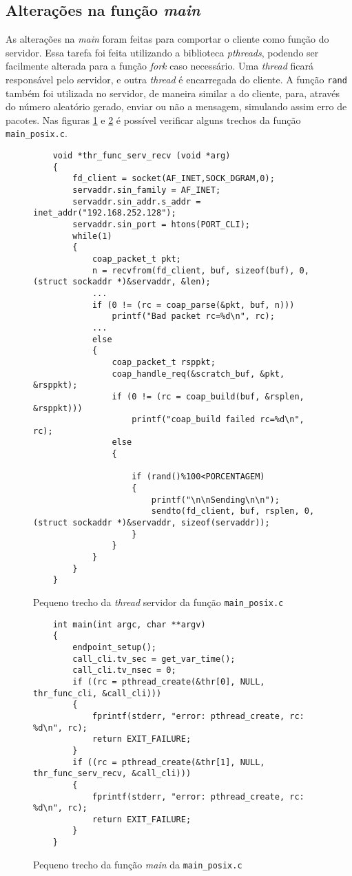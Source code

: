 \subsection{Alterações na função \textit{main}}

As alterações na \textit{main} foram feitas para comportar o cliente como função do servidor. Essa tarefa foi feita utilizando a biblioteca \textit{pthreads}, podendo ser facilmente alterada para a função \textit{fork} caso necessário. Uma \textit{thread} ficará responsável pelo servidor, e outra \textit{thread} é encarregada do cliente. A função \texttt{rand} também foi utilizada no servidor, de maneira similar a do cliente, para, através do número aleatório gerado, enviar ou não a mensagem, simulando assim erro de pacotes. Nas figuras \ref{code:thread_serv_main_posix.c} e \ref{code:main_main_posic.c} é possível verificar alguns trechos da função \texttt{main\_posix.c}.

\begin{figure}[!htb]
	\begin{lstlisting}
	void *thr_func_serv_recv (void *arg)
	{
		fd_client = socket(AF_INET,SOCK_DGRAM,0);
		servaddr.sin_family = AF_INET;
		servaddr.sin_addr.s_addr = inet_addr("192.168.252.128");
		servaddr.sin_port = htons(PORT_CLI);
		while(1)
		{
			coap_packet_t pkt;
			n = recvfrom(fd_client, buf, sizeof(buf), 0, (struct sockaddr *)&servaddr, &len);
			...
			if (0 != (rc = coap_parse(&pkt, buf, n)))
				printf("Bad packet rc=%d\n", rc);
			...
			else
			{			
				coap_packet_t rsppkt;
				coap_handle_req(&scratch_buf, &pkt, &rsppkt);
				if (0 != (rc = coap_build(buf, &rsplen, &rsppkt)))
					printf("coap_build failed rc=%d\n", rc);
				else
				{
					
					if (rand()%100<PORCENTAGEM)
					{
						printf("\n\nSending\n\n");
						sendto(fd_client, buf, rsplen, 0, (struct sockaddr *)&servaddr, sizeof(servaddr));
					}
				}
			}
		}
	}
	\end{lstlisting}
	\caption{Pequeno trecho da \textit{thread} servidor da função \texttt{main\_posix.c}}
	\label{code:thread_serv_main_posix.c}
\end{figure}


\begin{figure}[!htb]
	\begin{lstlisting}
	int main(int argc, char **argv)
	{
		endpoint_setup();
		call_cli.tv_sec = get_var_time();
		call_cli.tv_nsec = 0;
		if ((rc = pthread_create(&thr[0], NULL, thr_func_cli, &call_cli)))
		{
			fprintf(stderr, "error: pthread_create, rc: %d\n", rc);
			return EXIT_FAILURE;
		}
		if ((rc = pthread_create(&thr[1], NULL, thr_func_serv_recv, &call_cli)))
		{
			fprintf(stderr, "error: pthread_create, rc: %d\n", rc);
			return EXIT_FAILURE;
		}
	}
	\end{lstlisting}
	\caption{Pequeno trecho da função \textit{main} da \texttt{main\_posix.c}}
	\label{code:main_main_posic.c}
\end{figure}


